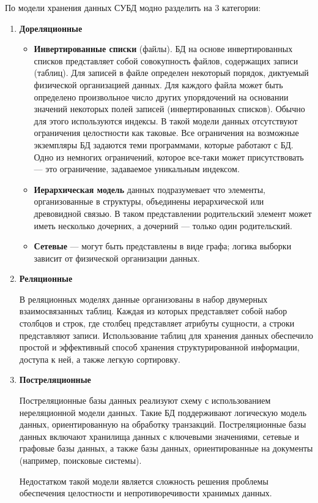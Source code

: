 По модели хранения данных СУБД модно разделить на 3 категории:
\begin{enumerate}[label=\arabic*.]
	\item \textbf{Дореляционные}
		\begin{itemize}[]
			\item \textbf{Инвертированные списки} (файлы). БД на основе инвертированных списков представляет собой совокупность файлов, содержащих записи (таблиц). Для записей в файле определен некоторый порядок, диктуемый физической организацией данных. Для каждого файла может быть определено произвольное число других упорядочений на основании значений некоторых полей записей (инвертированных списков). Обычно для этого используются индексы. В такой модели данных отсутствуют ограничения целостности как таковые. Все ограничения на возможные экземпляры БД задаются теми программами, которые работают с БД. Одно из немногих ограничений, которое все-таки может присутствовать --- это ограничение, задаваемое уникальным индексом. 
			\item \textbf{Иерархическая модель} данных подразумевает что элементы, организованные в структуры, объединены иерархической или древовидной связью. В таком представлении родительский элемент может иметь несколько дочерних,
			а дочерний --- только один родительский.
			\item \textbf{Сетевые} --- могут быть представлены в виде графа; логика выборки зависит от физической организации данных.
		\end{itemize}
	\item \textbf{Реляционные} \cite{db_sql}
	
	В реляционных моделях данные организованы в набор двумерных взаимосвязанных таблиц. Каждая из которых представляет собой набор столбцов и строк, где столбец представляет атрибуты сущности, а строки представляют записи.
	Использование таблиц для хранения данных обеспечило простой и эффективный способ хранения структурированной информации, доступа к ней, а также легкую сортировку.
	
	\item \textbf{Постреляционные} \cite{db_nosql}
	
	Постреляционные базы данных реализуют схему с использованием нереляционной модели данных. Такие БД поддерживают логическую модель данных, ориентированную на обработку транзакций. 
	Постреляционные базы данных включают хранилища данных с ключевыми значениями, сетевые и графовые базы данных, а также базы данных, ориентированные на документы (например, поисковые системы).
	
	Недостатком такой модели является сложность решения проблемы обеспечения целостности и непротиворечивости хранимых данных.
\end{enumerate}

